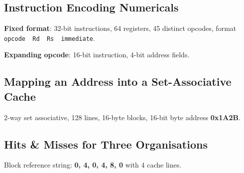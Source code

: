 \needspace{125pt}

\hypertarget{p2-02--112-instruction-encoding-numericals}{%
\subsection{Instruction Encoding Numericals}\label{p2-02--112-instruction-encoding-numericals}}

\textbf{Fixed format}: 32-bit instructions, 64 registers, 45 distinct opcodes, format \texttt{opcode\ \textbar{}\ Rd\ \textbar{}\ Rs\ \textbar{}\ immediate}.



\textbf{Expanding opcode}: 16-bit instruction, 4-bit address fields.



\needspace{125pt}

\hypertarget{p2-02--113-mapping-an-address-into-a-set-associative-cache}{%
\subsection{Mapping an Address into a Set-Associative Cache}\label{p2-02--113-mapping-an-address-into-a-set-associative-cache}}

2-way set associative, 128 lines, 16-byte blocks, 16-bit byte address \textbf{0x1A2B}.



\needspace{160pt}

\hypertarget{p2-02--114-hits--misses-for-three-organisations}{%
\subsection{Hits \& Misses for Three Organisations}\label{p2-02--114-hits--misses-for-three-organisations}}

Block reference string: \textbf{0, 4, 0, 4, 8, 0} with 4 cache lines.

\begingroup\small

